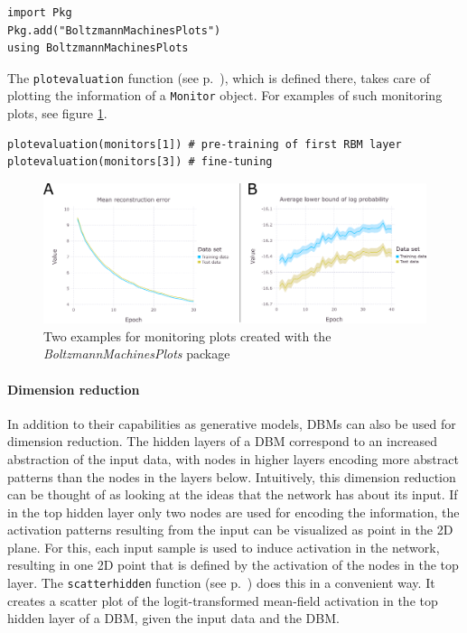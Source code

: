 \documentclass[12pt]{article}
\newcommand{\inlinecode}[1]{\texttt{#1}}
\newcommand{\apkg}[1]{\emph{#1}}
\begin{document}
\begin{lstlisting}
import Pkg
Pkg.add("BoltzmannMachinesPlots")
using BoltzmannMachinesPlots
\end{lstlisting}

The \inlinecode{plotevaluation} function (see p.\ \pageref{bmplots_plotevaluation}), which is defined there, takes care of plotting the information of a \inlinecode{Monitor} object.
For examples of such monitoring plots, see figure \ref{fig:monitoring_bmplots}.
\begin{lstlisting}
plotevaluation(monitors[1]) # pre-training of first RBM layer
plotevaluation(monitors[3]) # fine-tuning
\end{lstlisting}


\begin{figure}[h]
   \centering
   \includegraphics[scale=.59]{images/bmplots_curves.pdf}
   \caption{Two examples for monitoring plots created with the \apkg{BoltzmannMachinesPlots} package}
\label{fig:monitoring_bmplots}
\end{figure}


\paragraph{Dimension reduction}

In addition to their capabilities as generative models, DBMs can also be used for dimension reduction.
The hidden layers of a DBM correspond to an increased abstraction of the input data,
with nodes in higher layers encoding more abstract patterns than the nodes in the layers below. 
Intuitively, this dimension reduction can be thought of as looking at the ideas that the network has about its input.
If in the top hidden layer only two nodes are used for encoding the information, the activation patterns resulting from the input can be visualized as point in the 2D plane.
For this, each input sample is used to induce activation in the network, resulting in one 2D point that is defined by the activation of the nodes in the top layer.
The \inlinecode{scatterhidden} function (see p.\ \pageref{bmplots_scatterhidden}) does this in a convenient way.
It creates a scatter plot of the logit-transformed mean-field activation in the top hidden layer of a DBM, given the input data and the DBM.
\end{document}
